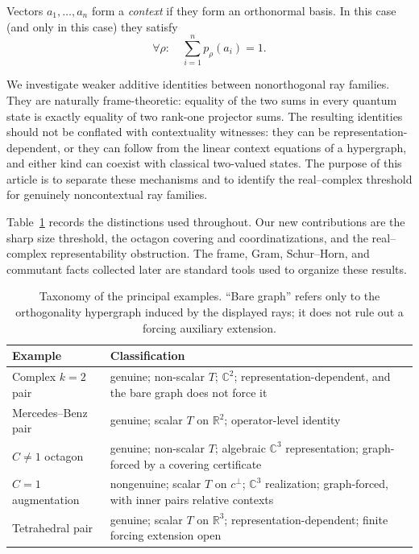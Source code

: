 \documentclass[
  twocolumn,
  aps,
  pra,
  floatfix,
  amsmath,amssymb,
  longbibliography
]{revtex4-2}
\theoremstyle{definition}
\theoremstyle{remark}
\begin{document}
Vectors $a_1,\ldots,a_n$ form a \emph{context} if they form an
orthonormal basis.  In this case (and only in this case) they satisfy
\begin{equation}
  \forall\rho:\quad \sum_{i=1}^{n}p_\rho(a_i)=1.
  \label{eq:context}
\end{equation}

We investigate weaker additive identities between nonorthogonal ray
families.  They are naturally frame-theoretic: equality of the two sums
in every quantum state is exactly equality of two rank-one projector
sums.  The resulting identities should not be conflated with
contextuality witnesses: they can be representation-dependent, or they
can follow from the linear context equations of a hypergraph, and either
kind can coexist with classical two-valued states.  The purpose of this
article is to separate these mechanisms and to identify the real--complex
threshold for genuinely noncontextual ray families.

Table~\ref{tab:taxonomy} records the distinctions used throughout.  Our
new contributions are the sharp size threshold, the octagon covering and
coordinatizations, and the real--complex representability obstruction.
The frame, Gram, Schur--Horn, and commutant facts collected later are
standard tools used to organize these results.

\begin{table}[t]
\caption{Taxonomy of the principal examples.  ``Bare graph'' refers only to
the orthogonality hypergraph induced by the displayed rays; it does not rule
out a forcing auxiliary extension.}
\label{tab:taxonomy}
\centering
\footnotesize
\begin{tabular}{@{}l l@{}}
\toprule
Example & Classification \\
\midrule
Complex $k=2$ pair & \parbox[t]{0.70\textwidth}{genuine; non-scalar $T$; $\mathbb C^2$; representation-dependent, and the bare graph does not force it} \\
Mercedes--Benz pair & \parbox[t]{0.70\textwidth}{genuine; scalar $T$ on $\mathbb R^2$; operator-level identity} \\
$C\ne1$ octagon & \parbox[t]{0.70\textwidth}{genuine; non-scalar $T$; algebraic $\mathbb C^3$ representation; graph-forced by a covering certificate} \\
$C=1$ augmentation & \parbox[t]{0.70\textwidth}{nongenuine; scalar $T$ on $c^\perp$; $\mathbb C^3$ realization; graph-forced, with inner pairs relative contexts} \\
Tetrahedral pair & \parbox[t]{0.70\textwidth}{genuine; scalar $T$ on $\mathbb R^3$; representation-dependent; finite forcing extension open} \\
\bottomrule
\end{tabular}
\end{table}
\end{document}
